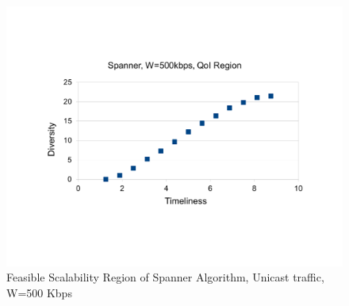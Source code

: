 \begin{figure}
    \includegraphics[scale=0.35]{figures/spanReg500k.pdf}
    \caption{Feasible Scalability Region of Spanner Algorithm, Unicast traffic, W=500 Kbps}
    \label{fig:spanScalRuni}
\end{figure}







